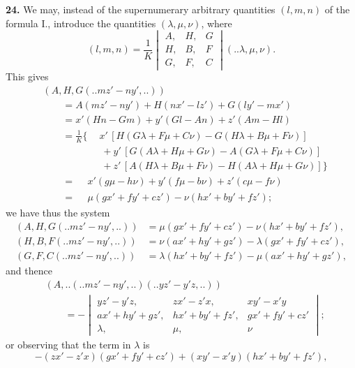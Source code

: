 \documentclass[12pt,a4paper]{article}
\newcommand{\qform}[2]{(#1 \mathbin{..} #2)}
\theoremstyle{definition}
\begin{document}
\textbf{24.} We may, instead of the supernumerary arbitrary quantities $(l, m, n)$ of the formula I., introduce the quantities $(\lambda, \mu, \nu)$, where
\[
(l, m, n) = \frac{1}{K}
\begin{vmatrix}
A, & H, & G \\
H, & B, & F \\
G, & F, & C
\end{vmatrix}
\!\qform{}{\lambda, \mu, \nu}.
\]
This gives
\begin{align*}
&(A, H, G \!\qform{}{mz' - ny',..})\\
&\qquad = A(mz' - ny') + H(nx' - lz') + G(ly' - mx')\\
&\qquad = x'(Hn - Gm) + y'(Gl - An) + z'(Am - Hl)\\
&\qquad = \frac{1}{K}\Big\{\phantom{+} x'\,[H(G\lambda + F\mu + C\nu) - G(H\lambda + B\mu + F\nu)]\\
&\qquad\qquad\qquad + y'\,[G(A\lambda + H\mu + G\nu) - A(G\lambda + F\mu + C\nu)]\\
&\qquad\qquad\qquad + z'\,[A(H\lambda + B\mu + F\nu) - H(A\lambda + H\mu + G\nu)]\Big\}\\
&\qquad = \phantom{\frac{1}{K}\Big\{} x'(g\mu - h\nu) + y'(f\mu - b\nu) + z'(c\mu - f\nu)\\
&\qquad = \phantom{\frac{1}{K}\Big\{} \mu(gx' + fy' + cz') - \nu(hx' + by' + fz');
\end{align*}
we have thus the system
\begin{align*}
(A, H, G \!\qform{}{mz' - ny',..}) &= \mu(gx' + fy' + cz') - \nu(hx' + by' + fz'),\\
(H, B, F \!\qform{}{mz' - ny',..}) &= \nu(ax' + hy' + gz') - \lambda(gx' + fy' + cz'),\\
(G, F, C \!\qform{}{mz' - ny',..}) &= \lambda(hx' + by' + fz') - \mu(ax' + hy' + gz'),
\end{align*}
and thence
\begin{align*}
&(A,..\!\qform{}{mz' - ny',..}\!\qform{}{yz' - y'z,..})\\
&\qquad = -
\begin{vmatrix}
yz' - y'z, & zx' - z'x, & xy' - x'y \\
ax' + hy' + gz', & hx' + by' + fz', & gx' + fy' + cz' \\
\lambda, & \mu, & \nu
\end{vmatrix};
\end{align*}
or observing that the term in $\lambda$ is
\[
-(zx' - z'x)(gx' + fy' + cz') + (xy' - x'y)(hx' + by' + fz'),
\]
\end{document}
